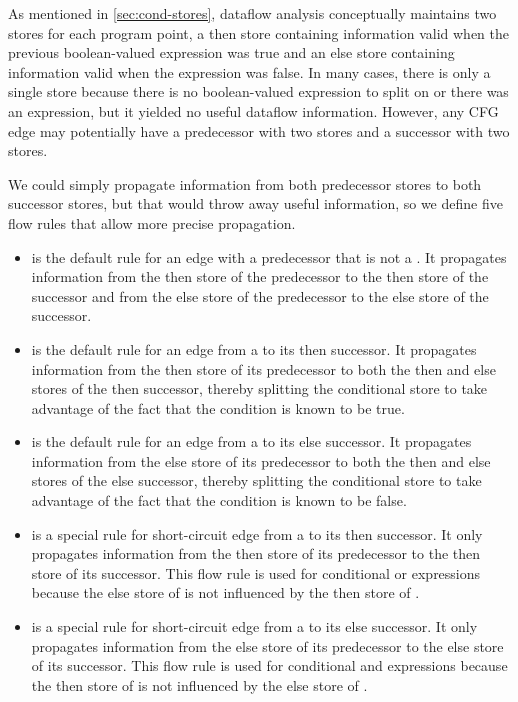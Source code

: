 As mentioned in \autoref{sec:cond-stores}, dataflow analysis conceptually maintains two stores for each program point, a then store containing information valid when the previous boolean-valued expression was true and an else store containing information valid when the expression was false.  In many cases, there is only a single store because there is no boolean-valued expression to split on or there was an expression, but it yielded no useful dataflow information.  However, any CFG edge may potentially have a predecessor with two stores and a successor with two stores.

We could simply propagate information from both predecessor stores to both successor stores, but that would throw away useful information, so we define five flow rules that allow more precise propagation.
        \begin{itemize}
        \item {} is the default rule for an edge with a predecessor that
                  is not a .  It propagates information from the then store
                  of the predecessor to the then store of the successor and from the else store of
                  the predecessor to the else store of the successor.
        \item {} is the default rule for an edge from a 
                  to its then successor.  It propagates information from the then store of its predecessor
                  to both the then and else stores of the then successor, thereby splitting the conditional
                  store to take advantage of the fact that the condition is known to be true.
        \item {} is the default rule for an edge from a 
                  to its else successor.  It propagates information from the else store of its predecessor
                  to both the then and else stores of the else successor, thereby splitting the conditional
                  store to take advantage of the fact that the condition is known to be false.
        \item {} is a special rule for short-circuit edge from a
                   to its then successor.  It only propagates information from
                  the then store of its predecessor to the then store of its successor.  This flow rule
                  is used for conditional or expressions because the else store of  is
                  not influenced by the then store of .
        \item {} is a special rule for short-circuit edge from a
                   to its else successor.  It only propagates information from
                  the else store of its predecessor to the else store of its successor.  This flow rule
                  is used for conditional and expressions because the then store of  is
                  not influenced by the else store of .
        \end{itemize}
        

